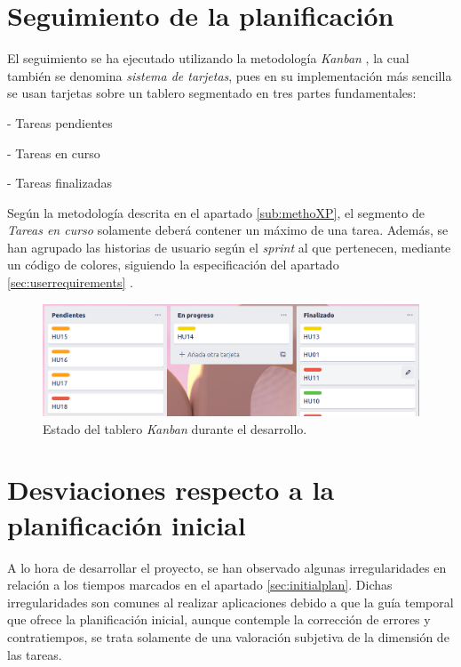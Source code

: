 
\section{Seguimiento de la planificación} \label{sec:tracking}

El seguimiento se ha ejecutado utilizando la metodología \textit{Kanban} \cite{wikiKanban}, la cual también se denomina \textit{sistema de tarjetas}, pues en su implementación más sencilla se usan tarjetas sobre un tablero segmentado en tres partes fundamentales:\sn

- Tareas pendientes

- Tareas en curso

- Tareas finalizadas\sn

Según la metodología descrita en el apartado \ref{sub:methoXP}, el segmento de \textit{Tareas en curso} solamente deberá contener un máximo de una tarea. Además, se han agrupado las historias de usuario según el \textit{sprint} al que pertenecen, mediante un código de colores, siguiendo la especificación del apartado \ref{sec:userrequirements} .\sn

\begin{figure}[h]
    \centering
    \includegraphics[width=14cm]{img/tables/09_Trello.png}
    \caption{Estado del tablero \textit{Kanban} durante el desarrollo.}
    \label{fig:trellokanban}
\end{figure}


\section{Desviaciones respecto a la planificación inicial} \label{sec:variations}

A lo hora de desarrollar el proyecto, se han observado algunas irregularidades en relación a los tiempos marcados en el apartado \ref{sec:initialplan}. Dichas irregularidades son comunes al realizar aplicaciones debido a que la guía temporal que ofrece la planificación inicial, aunque contemple la corrección de errores y contratiempos, se trata solamente de una valoración subjetiva de la dimensión de las tareas.\sn

